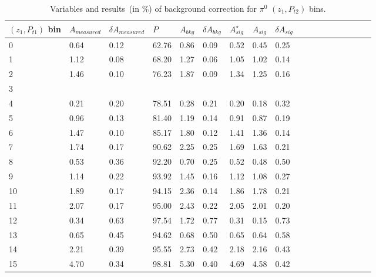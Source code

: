 \begin{table}[H]\footnotesize
\centering
\begin{tabular}{|l|l|l|l|l|l|l|l|l|l|l|l|l|l|l|l|l|l|}
\\ \hline
$(z_{1},P_{t1})$ bin & $A_{measured}$ & $\delta A_{measured}$ & $P$ & $A_{bkg}$ & $\delta A_{bkg}$ & $A_{sig}^{\star}$ & $ A_{sig}$  & $\delta A_{sig}$ \\ \hline
0 & 0.64 & 0.12 & 62.76 & 0.86 & 0.09 & 0.52 & 0.45 & 0.25 \\ \hline 
1 & 1.12 & 0.08 & 68.20 & 1.27 & 0.06 & 1.05 & 1.02 & 0.14 \\ \hline 
2 & 1.46 & 0.10 & 76.23 & 1.87 & 0.09 & 1.34 & 1.25 & 0.16 \\ \hline 
3 &  &  &  &  &  &  &  &  \\ \hline 
4 & 0.21 & 0.20 & 78.51 & 0.28 & 0.21 & 0.20 & 0.18 & 0.32 \\ \hline 
5 & 0.96 & 0.13 & 81.40 & 1.19 & 0.14 & 0.91 & 0.87 & 0.19 \\ \hline 
6 & 1.47 & 0.10 & 85.17 & 1.80 & 0.12 & 1.41 & 1.36 & 0.14 \\ \hline 
7 & 1.74 & 0.17 & 90.62 & 2.25 & 0.25 & 1.69 & 1.63 & 0.21 \\ \hline 
8 & 0.53 & 0.36 & 92.20 & 0.70 & 0.25 & 0.52 & 0.48 & 0.50 \\ \hline 
9 & 1.14 & 0.22 & 93.92 & 1.45 & 0.16 & 1.12 & 1.08 & 0.27 \\ \hline 
10 & 1.89 & 0.17 & 94.15 & 2.36 & 0.14 & 1.86 & 1.78 & 0.21 \\ \hline 
11 & 2.07 & 0.17 & 95.00 & 2.43 & 0.22 & 2.05 & 2.01 & 0.20 \\ \hline 
12 & 0.34 & 0.63 & 97.54 & 1.72 & 0.77 & 0.31 & 0.15 & 0.73 \\ \hline 
13 & 0.65 & 0.45 & 94.62 & 0.68 & 0.50 & 0.65 & 0.64 & 0.58 \\ \hline 
14 & 2.21 & 0.39 & 95.55 & 2.73 & 0.42 & 2.18 & 2.16 & 0.43 \\ \hline 
15 & 4.70 & 0.34 & 98.81 & 5.30 & 0.40 & 4.69 & 4.58 & 0.42 \\ \hline 
\end{tabular}
\caption{Variables and results~(in $\%$) of background correction for $\pi^0$ $(z_1,P_{t2})$ bins.}
\label{tab:zptbkgcor}
\end{table}  

